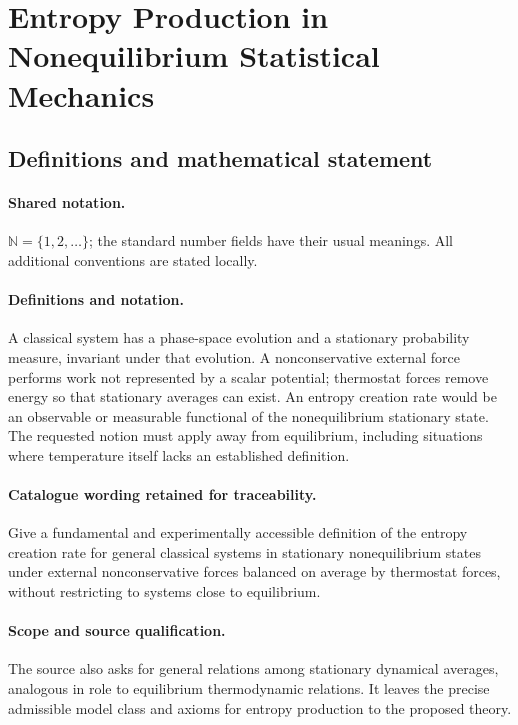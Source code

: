 \documentclass[11pt]{article}
\begin{document}
\section{Entropy Production in Nonequilibrium Statistical Mechanics}\label{statement}

\subsection{Definitions and mathematical statement}

\paragraph{Shared notation.}$\mathbb N=\{1,2,\ldots\}$; the standard number fields have their usual meanings. All additional conventions are stated locally.


\paragraph{Definitions and notation.}A classical system has a phase-space evolution and a stationary probability measure, invariant under that evolution. A nonconservative external force performs work not represented by a scalar potential; thermostat forces remove energy so that stationary averages can exist. An entropy creation rate would be an observable or measurable functional of the nonequilibrium stationary state. The requested notion must apply away from equilibrium, including situations where temperature itself lacks an established definition.

\paragraph{Catalogue wording retained for traceability.}
Give a fundamental and experimentally accessible definition of the entropy creation rate for general classical systems in stationary nonequilibrium states under external nonconservative forces balanced on average by thermostat forces, without restricting to systems close to equilibrium.
\paragraph{Scope and source qualification.}The source also asks for general relations among stationary dynamical averages, analogous in role to equilibrium thermodynamic relations. It leaves the precise admissible model class and axioms for entropy production to the proposed theory.
\end{document}
